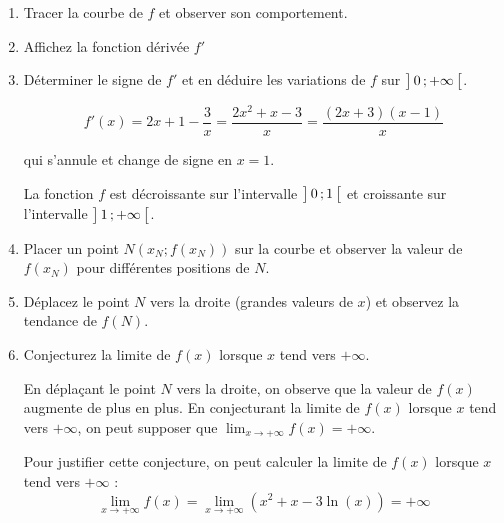 \documentclass[11pt, a4paper]{report}
\begin{document}
\begin{enumerate}[resume]
    \item Tracer la courbe de $f$ et observer son comportement. 
    \item Affichez la fonction dérivée $f'$  
    \item Déterminer le signe de $f'$ et en déduire les variations de $f$ sur $\bigl] \, 0 \, ; +\infty \,\bigl[$. 
    \begin{blocvisible}[height=5]
        \begin{minipage}{0.58\linewidth}
            \[f'(x) = 2x + 1 - \dfrac{3}{x} = \dfrac{2x^2 + x - 3}{x} = \dfrac{(2x+3)(x-1)}{x}\] 
        
            qui s'annule et change de signe en $x=1$.

            La fonction $f$ est décroissante sur l'intervalle $\bigl] \, 0 \, ; 1 \,\bigl[$ et croissante sur l'intervalle $\bigl] \, 1 \, ; +\infty \,\bigl[$.
        \end{minipage}\hfill
        \begin{minipage}{0.4\linewidth}
\end{minipage}
    \end{blocvisible}
        
    
    \item Placer un point $N\left(x_N; f(x_N)\right)$ sur la courbe et observer la valeur de $f(x_N)$ pour différentes positions de $N$.        
    \item Déplacez le point $N$ vers la droite (grandes valeurs de $x$) et observez la tendance de $f(N)$. 
    \item Conjecturez la limite de $f(x)$ lorsque $x$ tend vers $+\infty$.  
    
    \begin{blocvisible}[height=3]
        En déplaçant le point $N$ vers la droite, on observe que la valeur de $f(x)$ augmente de plus en plus. En conjecturant la limite de $f(x)$ lorsque $x$ tend vers $+\infty$, on peut supposer que $\lim_{x \to +\infty} f(x) = +\infty$.

        Pour justifier cette conjecture, on peut calculer la limite de $f(x)$ lorsque $x$ tend vers $+\infty$ :
        \[\lim_{x \to +\infty} f(x) = \lim_{x \to +\infty} (x^2 + x - 3\ln(x))=+\infty\]
    \end{blocvisible}
\end{enumerate}
\end{document}
